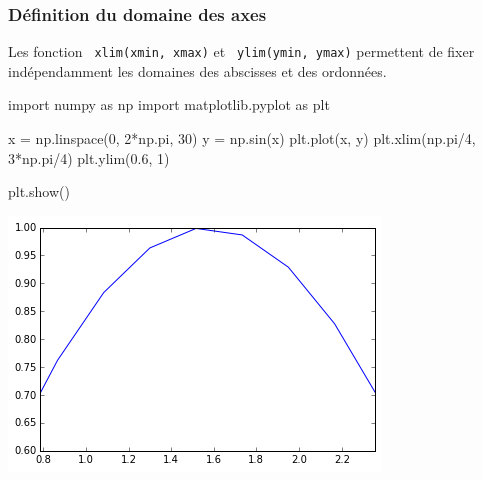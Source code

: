 \begin{frame}[fragile]
\frametitle{Définition du domaine des axes}

Les fonction \verb? xlim(xmin, xmax)? et \verb? ylim(ymin, ymax)? permettent de fixer indépendamment les domaines des abscisses et des ordonnées.

\begin{minipage}{0.5\linewidth}
\begin{GrayBox}[0.85\textwidth]
\begin{verbatimtab}[3]
import numpy as np
import matplotlib.pyplot as plt

x = np.linspace(0, 2*np.pi, 30)
y = np.sin(x)
plt.plot(x, y)
plt.xlim(np.pi/4, 3*np.pi/4)
plt.ylim(0.6, 1)

plt.show()
\end{verbatimtab}
\end{GrayBox}
\end{minipage}\hfill
\begin{minipage}{0.46\linewidth}
\begin{center}
 \includegraphics[width=0.9\linewidth]{img/courbe2}
\end{center}
\end{minipage}

\end{frame}

